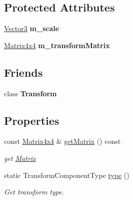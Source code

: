 \subsection*{Protected Attributes}
\begin{DoxyCompactItemize}
\item 
\mbox{\label{classrev_1_1_scale_component_ac70774c0793bc91d47087313fb3e365a}} 
\mbox{\hyperlink{classrev_1_1_vector}{Vector3}} {\bfseries m\+\_\+scale}
\item 
\mbox{\label{classrev_1_1_scale_component_acec6255804275b9672c8856290ac478e}} 
\mbox{\hyperlink{classrev_1_1_square_matrix}{Matrix4x4}} {\bfseries m\+\_\+transform\+Matrix}
\end{DoxyCompactItemize}
\subsection*{Friends}
\begin{DoxyCompactItemize}
\item 
\mbox{\label{classrev_1_1_scale_component_af851b4d9aacd1a871da33592334b8d72}} 
class {\bfseries Transform}
\end{DoxyCompactItemize}
\subsection*{Properties}
\begin{DoxyCompactItemize}
\item 
\mbox{\label{classrev_1_1_scale_component_a807125837ec48b85a70de37d96653ec3}} 
const \mbox{\hyperlink{classrev_1_1_square_matrix}{Matrix4x4}} \& \mbox{\hyperlink{classrev_1_1_scale_component_a807125837ec48b85a70de37d96653ec3}{get\+Matrix}} () const
\begin{DoxyCompactList}\small\item\em get \mbox{\hyperlink{classrev_1_1_matrix}{Matrix}} \end{DoxyCompactList}\item 
\mbox{\label{classrev_1_1_scale_component_a2f5c7ff52af9c0bc8e3b98519594738a}} 
static Transform\+Component\+Type \mbox{\hyperlink{classrev_1_1_scale_component_a2f5c7ff52af9c0bc8e3b98519594738a}{type}} ()
\begin{DoxyCompactList}\small\item\em Get transform type. \end{DoxyCompactList}\end{DoxyCompactItemize}


